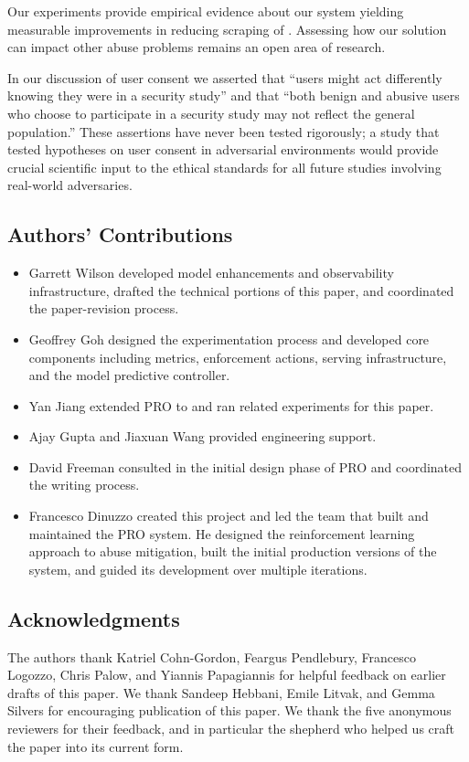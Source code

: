  Our experiments provide empirical evidence about our system yielding measurable improvements in reducing scraping of \osns. Assessing how our solution can impact other abuse problems remains an open area of research.

 In our discussion of user consent we asserted that ``users might act differently knowing they were in a security study'' and that ``both benign and abusive users who choose to participate in a security study may not reflect the general population.'' These assertions have never been tested rigorously; a study that tested hypotheses on user consent in adversarial environments would provide crucial scientific input to the ethical standards for all future studies  involving real-world adversaries.

\ifanon
\else

\newpage

\subsection*{Authors' Contributions}

\begin{itemize}
    \squeezelist
    \item Garrett Wilson developed model enhancements and observability infrastructure, drafted the technical portions of this paper, and coordinated the paper-revision process.
    \item Geoffrey Goh designed the experimentation process and developed core components including metrics, enforcement actions, serving infrastructure, and the model predictive controller.
    \item Yan Jiang extended PRO to \fb and ran related experiments for this paper.
    \item Ajay Gupta and Jiaxuan Wang provided engineering support.
    \item David Freeman consulted in the initial design phase of PRO and coordinated the writing process.
    \item Francesco Dinuzzo created this project and led the team that built and maintained the PRO system. He designed the reinforcement learning approach to abuse mitigation, built the initial production versions of the system, and guided its development over multiple iterations.
\end{itemize}

\subsection*{Acknowledgments}

The authors thank Katriel Cohn-Gordon, Feargus Pendlebury, Francesco Logozzo, Chris Palow, and Yiannis Papagiannis for helpful feedback on earlier drafts of this paper. We thank Sandeep Hebbani, Emile Litvak, and Gemma Silvers for encouraging publication of this paper. We thank the five anonymous reviewers for their feedback, and in particular the shepherd who helped us craft the paper into its current form.

\fi
